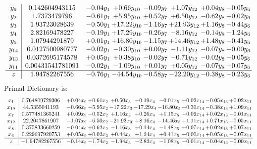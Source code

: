 \documentclass[9pt]{article}
\begin{document}
\[\begin{array}{c| c c@{\hskip 2pt} c@{\hskip 2pt} c@{\hskip 2pt} c@{\hskip 2pt} c@{\hskip 2pt} c@{\hskip 2pt} }
 y_{9}   &  0.142604943115 & -0.04 y_{1} & +  0.66 y_{10} & -0.09 y_{7} & +  1.07 y_{12} & +  0.04 y_{8} & -0.05 y_{6}\\
 y_{2}   &  1.7373479796 & -0.61 y_{1} & +  5.95 y_{10} & +  0.52 y_{7} & +  6.50 y_{12} & -0.62 y_{8} & -0.02 y_{6}\\
 y_{3}   &  1.93723028639 & -0.50 y_{1} & + 17.22 y_{10} & -1.16 y_{7} & + 21.93 y_{12} & +  1.16 y_{8} & -0.44 y_{6}\\
 y_{4}   &  2.82169478227 & -0.19 y_{1} & + 17.29 y_{10} & -0.26 y_{7} & -8.16 y_{12} & -0.14 y_{8} & -1.24 y_{6}\\
 y_{5}   &  1.07944291879 & +  0.01 y_{1} & + 16.80 y_{10} & -1.15 y_{7} & + 14.46 y_{12} & +  1.48 y_{8} & -0.41 y_{6}\\
 y_{14}   &  0.0127500980777 & -0.02 y_{1} & -0.30 y_{10} & +  0.09 y_{7} & -1.11 y_{12} & -0.07 y_{8} & -0.00 y_{6}\\
 y_{13}   &  0.0372695174578 & +  0.05 y_{1} & +  0.38 y_{10} & -0.02 y_{7} & -0.71 y_{12} & -0.02 y_{8} & -0.05 y_{6}\\
 y_{11}   &  0.00431541781091 & -0.02 y_{1} & -1.09 y_{10} & +  0.01 y_{7} & +  0.05 y_{12} & -0.07 y_{8} & +  0.07 y_{6}\\
\hline
z    &  1.94782267556 & -0.76 y_{1} & -44.54 y_{10} & -0.58 y_{7} & -22.20 y_{12} & -0.38 y_{8} & -0.23 y_{6}\\
\end{array}\]
Primal Dictionary is:
\[\begin{array}{c| c c@{\hskip 2pt} c@{\hskip 2pt} c@{\hskip 2pt} c@{\hskip 2pt} c@{\hskip 2pt} c@{\hskip 2pt} c@{\hskip 2pt} c@{\hskip 2pt} }
 x_{1}   &  0.764809729306 & +  0.04 x_{9} & +  0.61 x_{2} & +  0.50 x_{3} & +  0.19 x_{4} & -0.01 x_{5} & +  0.02 x_{14} & -0.05 x_{13} & +  0.02 x_{11}\\
 x_{10}   &  44.5355041193 & -0.66 x_{9} & -5.95 x_{2} & -17.22 x_{3} & -17.29 x_{4} & -16.80 x_{5} & +  0.30 x_{14} & -0.38 x_{13} & +  1.09 x_{11}\\
 x_{7}   &  0.577481365241 & +  0.09 x_{9} & -0.52 x_{2} & +  1.16 x_{3} & +  0.26 x_{4} & +  1.15 x_{5} & -0.09 x_{14} & +  0.02 x_{13} & -0.01 x_{11}\\
 x_{12}   &  22.2047861907 & -1.07 x_{9} & -6.50 x_{2} & -21.93 x_{3} & +  8.16 x_{4} & -14.46 x_{5} & +  1.11 x_{14} & +  0.71 x_{13} & -0.05 x_{11}\\
 x_{8}   &  0.375833660259 & -0.04 x_{9} & +  0.62 x_{2} & -1.16 x_{3} & +  0.14 x_{4} & -1.48 x_{5} & +  0.07 x_{14} & +  0.02 x_{13} & +  0.07 x_{11}\\
 x_{6}   &  0.229697920753 & +  0.05 x_{9} & +  0.02 x_{2} & +  0.44 x_{3} & +  1.24 x_{4} & +  0.41 x_{5} & +  0.00 x_{14} & +  0.05 x_{13} & -0.07 x_{11}\\
\hline
z    &  -1.94782267556 & -0.14 x_{9} & -1.74 x_{2} & -1.94 x_{3} & -2.82 x_{4} & -1.08 x_{5} & -0.01 x_{14} & -0.04 x_{13} & -0.00 x_{11}\\
\end{array}\]
\end{document}
